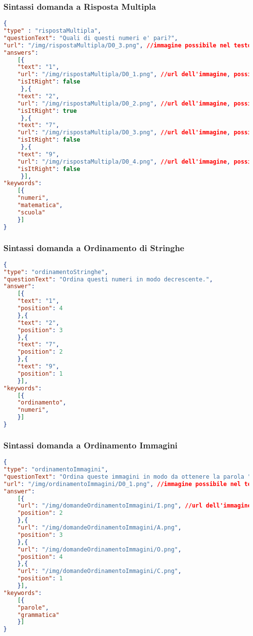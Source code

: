 \subsubsection{Sintassi domanda a Risposta Multipla}
\begin{lstlisting}[language=json,firstnumber=1]
{	
"type" : "rispostaMultipla",
"questionText": "Quali di questi numeri e' pari?",
"url": "/img/rispostaMultipla/D0_3.png", //immagine possibile nel testo della domanda risposta multipla
"answers":
	[{
	"text": "1",
	"url": "/img/rispostaMultipla/D0_1.png", //url dell'immagine, possibile campo facoltativo
	"isItRight": false
	 },{
	"text": "2",
	"url": "/img/rispostaMultipla/D0_2.png", //url dell'immagine, possibile campo facoltativo
	"isItRight": true
	 },{
	"text": "7",
	"url": "/img/rispostaMultipla/D0_3.png", //url dell'immagine, possibile campo facoltativo
	"isItRight": false
	 },{
	"text": "9",
	"url": "/img/rispostaMultipla/D0_4.png", //url dell'immagine, possibile campo facoltativo
	"isItRight": false
	 }],
"keywords":
	[{
	"numeri",
	"matematica",
	"scuola"
	}]
}
\end{lstlisting}

\subsubsection{Sintassi domanda a Ordinamento di Stringhe}
\begin{lstlisting}[language=json,firstnumber=1]
{
"type": "ordinamentoStringhe",
"questionText": "Ordina questi numeri in modo decrescente.",
"answer":
	[{
	"text": "1",
	"position": 4
	},{
	"text": "2",
	"position": 3
	},{
	"text": "7",
	"position": 2
	},{
	"text": "9",
	"position": 1
	}],
"keywords":
	[{
	"ordinamento",
	"numeri",
	}]
}
\end{lstlisting}

\subsubsection{Sintassi domanda a Ordinamento Immagini}
\begin{lstlisting}[language=json,firstnumber=1]
{
"type": "ordinamentoImmagini",
"questionText": "Ordina queste immagini in modo da ottenere la parola "CIAO".",
"url": "/img/ordinamentoImmagini/D0_1.png", //immagine possibile nel testo della domanda ad ordianamento di immagini
"answer":
	[{
	"url": "/img/domandeOrdinamentoImmagini/I.png", //url dell'immagine
	"position": 2
	},{
	"url": "/img/domandeOrdinamentoImmagini/A.png",
	"position": 3
	},{
	"url": "/img/domandeOrdinamentoImmagini/O.png",
	"position": 4
	},{
	"url": "/img/domandeOrdinamentoImmagini/C.png",
	"position": 1
	}],
"keywords":
	[{
	"parole",
	"grammatica"
	}]
}
\end{lstlisting}

